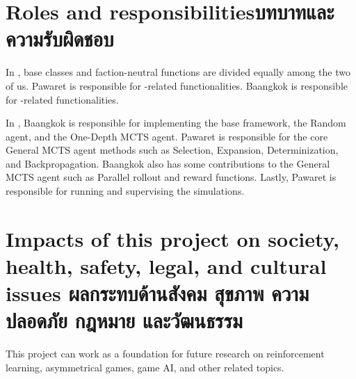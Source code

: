 \section{\ifenglish Roles and responsibilities\else บทบาทและความรับผิดชอบ\fi}
In \RootOurs{}, base classes and faction-neutral functions are divided equally among the two of us. Pawaret is responsible for \Marquise{}-related functionalities. Baangkok is responsible for \Eyrie{}-related functionalities.

In \RootAI, Baangkok is responsible for implementing the base framework, the Random agent, and the One-Depth MCTS agent. Pawaret is responsible for the core General MCTS agent methods such as Selection, Expansion, Determinization, and Backpropagation. Baangkok also has some contributions to the General MCTS agent such as Parallel rollout and reward functions. Lastly, Pawaret is responsible for running and supervising the simulations.



\section{\ifenglish%
Impacts of this project on society, health, safety, legal, and cultural issues
\else%
ผลกระทบด้านสังคม สุขภาพ ความปลอดภัย กฎหมาย และวัฒนธรรม
\fi}
This project can work as a foundation for future research on reinforcement learning, asymmetrical games, game AI, and other related topics.
